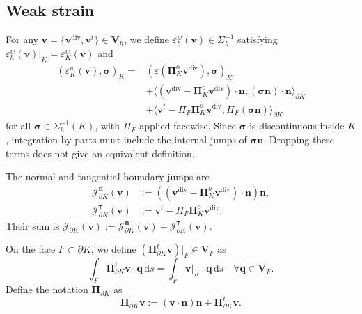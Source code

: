\documentclass[review,hidelinks,onefignum,onetabnum]{siamart251216}
\newcommand{\AI}[1]{{\color{blue}#1}}
\begin{document}
\subsection{Weak strain}
For any \(\boldsymbol{v} = \{ \boldsymbol{v}^{\operatorname{div}}, \boldsymbol{v}^t \} \in \boldsymbol{V}_h\), 
we define \(\varepsilon^w_h(\boldsymbol{v}) \in \Sigma_h^{-1}\) satisfying \( \varepsilon^w_h(\boldsymbol{v})|_K=\varepsilon_K^w(\boldsymbol{v})\) and
\begin{equation}\label{equ:weakstrain1}
\begin{aligned}
(\varepsilon_K^w(\boldsymbol v),\boldsymbol\sigma)_K
={}&(\varepsilon(\boldsymbol\Pi_K^o\boldsymbol v^{\operatorname{div}}),\boldsymbol\sigma)_K\\
&+\langle(\boldsymbol v^{\operatorname{div}}-
 \boldsymbol\Pi_K^o\boldsymbol v^{\operatorname{div}})\cdot\boldsymbol n,
 (\boldsymbol\sigma\boldsymbol n)\cdot\boldsymbol n\rangle_{\partial K}\\
&+\langle\boldsymbol v^t-\Pi_F\boldsymbol\Pi_K^o\boldsymbol v^{\operatorname{div}},
 \Pi_F(\boldsymbol\sigma\boldsymbol n)\rangle_{\partial K}
\end{aligned}
\end{equation}
for all $\boldsymbol\sigma\in\Sigma_h^{-1}(K)$, with $\Pi_F$ applied facewise.
\AI{Since $\boldsymbol\sigma$ is discontinuous inside $K$, integration by
parts must include the internal jumps of $\boldsymbol\sigma\boldsymbol n$.
Dropping these terms does not give an equivalent definition.}

The normal and tangential boundary jumps are
\[
\begin{aligned}
\mathcal J_{\partial K}^{\boldsymbol n}(\boldsymbol v)
&:=((\boldsymbol v^{\operatorname{div}}-
\boldsymbol\Pi_K^o\boldsymbol v^{\operatorname{div}})\cdot\boldsymbol n)\boldsymbol n,\\
\mathcal J_{\partial K}^{\boldsymbol\tau}(\boldsymbol v)
&:=\boldsymbol v^t-\Pi_F\boldsymbol\Pi_K^o\boldsymbol v^{\operatorname{div}}.
\end{aligned}
\]
Their sum is $\mathcal J_{\partial K}(\boldsymbol v):=
\mathcal J_{\partial K}^{\boldsymbol n}(\boldsymbol v)+
\mathcal J_{\partial K}^{\boldsymbol\tau}(\boldsymbol v)$.

 On the face \(F \subset \partial K\), we define \((\boldsymbol{\Pi}_{\partial K}^t \boldsymbol{v})|_F \in \boldsymbol{V}_F\) as
\[
\int_F \boldsymbol{\Pi}_{\partial K}^t \boldsymbol{v} \cdot \boldsymbol{q}\,\mathrm ds = \int_F \boldsymbol{v}|_K \cdot \boldsymbol{q}\,\mathrm ds \quad \forall \boldsymbol{q} \in \boldsymbol{V}_F.
\]
Define the notation \(\boldsymbol{\Pi}_{\partial K}\) as
\[
\boldsymbol{\Pi}_{\partial K} \boldsymbol{v} := (\boldsymbol{v} \cdot \boldsymbol{n})\boldsymbol{n} + \boldsymbol{\Pi}_{\partial K}^t \boldsymbol{v}.
\]
\end{document}
